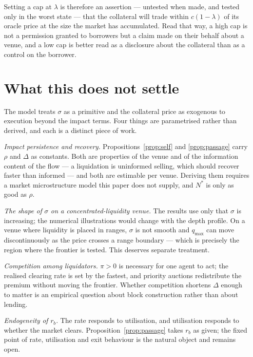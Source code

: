 \documentclass[11pt,a4paper]{article}
\theoremstyle{plain}
\theoremstyle{definition}
\theoremstyle{remark}
\begin{document}
Setting a cap at $\lambda$ is therefore an assertion --- untested when made, and tested only in the
worst state --- that the collateral will trade within $c(1-\lambda)$ of its oracle price at the
size the market has accumulated. Read that way, a high cap is not a permission granted to
borrowers but a claim made on their behalf about a venue, and a low cap is better read as a
disclosure about the collateral than as a control on the borrower.

\section{What this does not settle}

The model treats $\sigma$ as a primitive and the collateral price as exogenous to execution beyond
the impact terms. Four things are parametrised rather than derived, and each is a distinct piece of
work.

\emph{Impact persistence and recovery.} Propositions~\ref{prop:self} and \ref{prop:passage} carry
$\rho$ and $\Delta$ as constants. Both are properties of the venue and of the information content
of the flow --- a liquidation is uninformed selling, which should recover faster than informed ---
and both are estimable per venue. Deriving them requires a market microstructure model this paper
does not supply, and $N^{*}$ is only as good as $\rho$.

\emph{The shape of $\sigma$ on a concentrated-liquidity venue.} The results use only that $\sigma$
is increasing; the numerical illustrations would change with the depth profile. On a venue where
liquidity is placed in ranges, $\sigma$ is not smooth and $q_{\max}$ can move discontinuously as
the price crosses a range boundary --- which is precisely the region where the frontier is tested.
This deserves separate treatment.

\emph{Competition among liquidators.} $\pi>0$ is necessary for one agent to act; the realised
clearing rate is set by the fastest, and priority auctions redistribute the premium without moving
the frontier. Whether competition shortens $\Delta$ enough to matter is an empirical question about
block construction rather than about lending.

\emph{Endogeneity of $r_b$.} The rate responds to utilisation, and utilisation responds to whether
the market clears. Proposition~\ref{prop:passage} takes $r_b$ as given; the fixed point of rate,
utilisation and exit behaviour is the natural object and remains open.
\end{document}

